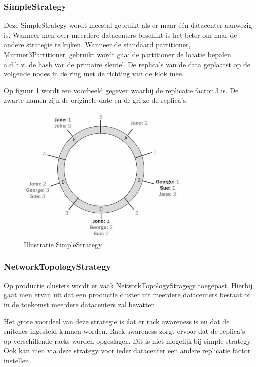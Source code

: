 \subsubsection{SimpleStrategy}
Deze SimpleStrategy wordt meestal gebruikt als er maar één datacenter aanwezig is.
Wanneer men over meerdere datacenters beschikt is het beter om naar de andere strategie te kijken.
Wanneer de standaard partitioner, Murmer3Partitioner, gebruikt wordt gaat de partitioner de locatie bepalen a.d.h.v. de hash van de primaire sleutel.
De replica's van de data geplaatst op de volgende nodes in de ring met de richting van de klok mee.
	
Op figuur \ref{fig:simple_strategy} wordt een voorbeeld gegeven waarbij de replicatie factor 3 is.
De zwarte namen zijn de originele date en de grijze de replica's.
	
\begin{figure}[H]
	\centering
	\includegraphics[width=0.75\textwidth]{img/4_architectuur/SimpleStrategy}
	\caption{Illustratie SimpleStrategy \citep{strickland2014availability}}
	\label{fig:simple_strategy}
\end{figure}
	
	
\subsubsection{NetworkTopologyStrategy}
Op productie clusters wordt er vaak NetworkTopologyStragegy toegepast.
Hierbij gaat men ervan uit dat een productie cluster uit meerdere datacenters bestaat of in de toekomst meerdere datacenters zal bevatten.

Het grote voordeel van deze strategie is dat er rack awareness is en dat de snitches ingesteld kunnen worden.
Rack awareness zorgt ervoor dat de replica's op verschillende racks worden opgeslagen.
Dit is niet mogelijk bij simple strategy.
Ook kan men via deze strategy voor ieder datacenter een andere replicatie factor instellen.


